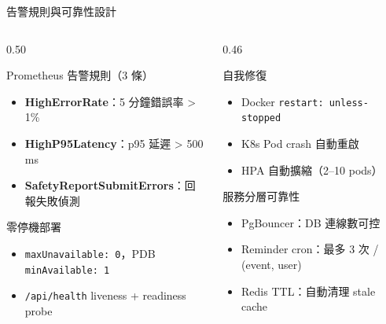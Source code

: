 \documentclass[aspectratio=169,12pt]{beamer}
\begin{document}
\begin{frame}[shrink=15]{告警規則與可靠性設計}
\begin{columns}[T,onlytextwidth]
\begin{column}{0.50\textwidth}
  \begin{alertblock}{Prometheus 告警規則（3 條）}
    \begin{itemize}\small
      \item \textbf{HighErrorRate}：5 分鐘錯誤率 \textgreater{} 1\%
      \item \textbf{HighP95Latency}：p95 延遲 \textgreater{} 500 ms
      \item \textbf{SafetyReportSubmitErrors}：回報失敗偵測
    \end{itemize}
  \end{alertblock}
  \vspace{0.2cm}
  \begin{block}{零停機部署}
    \begin{itemize}\small
      \item \texttt{maxUnavailable: 0}，PDB \texttt{minAvailable: 1}
      \item \texttt{/api/health} liveness + readiness probe
    \end{itemize}
  \end{block}
\end{column}
\begin{column}{0.46\textwidth}
  \begin{block}{自我修復}
    \begin{itemize}\small
      \item Docker \texttt{restart: unless-stopped}
      \item K8s Pod crash \textrightarrow{} 自動重啟
      \item HPA 自動擴縮（2--10 pods）
    \end{itemize}
  \end{block}
  \begin{block}{服務分層可靠性}
    \begin{itemize}\small
      \item PgBouncer：DB 連線數可控
      \item Reminder cron：最多 3 次 / (event, user)
      \item Redis TTL：自動清理 stale cache
    \end{itemize}
  \end{block}
\end{column}
\end{columns}
\end{frame}
\end{document}
